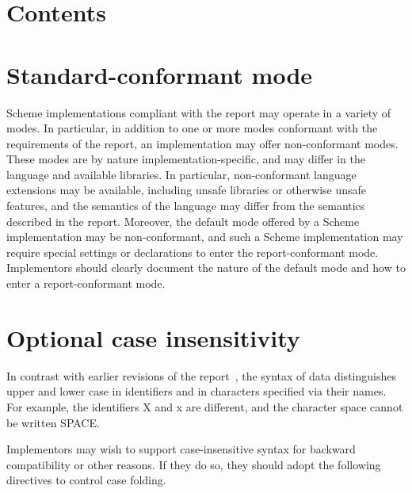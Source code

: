 \documentclass[twoside,twocolumn]{algol60}
\begin{document}
\texonly\clearpage\endtexonly

\chapter*{Contents}
\addvspace{3.5pt}                  %
\renewcommand{\tocshrink}{-4.0pt}  %
{%
\tableofcontents
}

\vfill

\texonly\clearpage\endtexonly

\appendix

\chapter{Standard-conformant mode}
\label{standardconformantmode}

Scheme implementations compliant with the report may operate in a
variety of modes.  In particular, in addition to one or more modes
conformant with the requirements of the report, an implementation
may offer non-conformant modes.  These modes are by nature
implementation-specific, and may differ in the language and available
libraries.  In particular, non-conformant language extensions may be
available, including unsafe libraries or otherwise unsafe features,
and the semantics of the language may differ from the semantics
described in the report.  Moreover, the default mode offered by a
Scheme implementation may be non-conformant, and such a Scheme
implementation may require special settings or declarations to enter
the report-conformant mode.  Implementors should clearly
document the nature of the default mode and how to enter a
report-conformant mode.

\chapter{Optional case insensitivity}
\label{caseinsensitivityappendix}

In contrast with earlier revisions of the report~\cite{R5RS}, the
syntax of data distinguishes upper and lower case in identifiers and in
characters specified via their names.  For example, the identifiers
{\cf X} and {\cf x} are different, and the character
{\cf\sharpsign\backwhack{}space} cannot be written
{\cf\sharpsign\backwhack{}SPACE}.

Implementors may wish to support case-insensitive syntax for backward
compatibility or other reasons.
If they do so, they should adopt the following directives
to control case folding.
\end{document}
